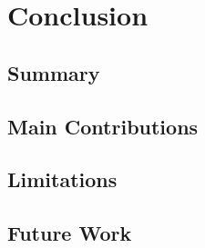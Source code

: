 \chapter{Conclusion}
\label{chap:conclusion}
\section{Summary}
\section{Main Contributions}
\section{Limitations}
\section{Future Work}
